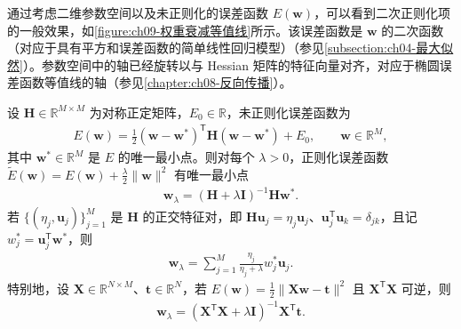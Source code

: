 \documentclass[../../main.tex]{subfiles}
\begin{document}
通过考虑二维参数空间以及未正则化的误差函数 $E(\boldsymbol{w})$，可以看到二次正则化项的一般效果，如\cref{figure:ch09-权重衰减等值线}所示。该误差函数是 $\boldsymbol{w}$ 的二次函数（对应于具有平方和误差函数的简单线性回归模型）（参见\cref{subsection:ch04-最大似然}）。参数空间中的轴已经旋转以与 Hessian 矩阵的特征向量对齐，对应于椭圆误差函数等值线的轴（参见\cref{chapter:ch08-反向传播}）。

\begin{theorem}[$L_{2}$ 正则化的闭式解]\label{theorem:ch09-L2闭式解}
设 $\boldsymbol{H}\in\mathbb{R}^{M\times M}$ 为对称正定矩阵，$E_{0}\in\mathbb{R}$，未正则化误差函数为
\begin{align*}
E(\boldsymbol{w})=\frac{1}{2}(\boldsymbol{w}-\boldsymbol{w}^{*})^{\mathsf T}\boldsymbol{H}(\boldsymbol{w}-\boldsymbol{w}^{*})+E_{0},\qquad \boldsymbol{w}\in\mathbb{R}^{M},
\end{align*}
其中 $\boldsymbol{w}^{*}\in\mathbb{R}^{M}$ 是 $E$ 的唯一最小点。则对每个 $\lambda>0$，正则化误差函数 $\widetilde{E}(\boldsymbol{w})=E(\boldsymbol{w})+\frac{\lambda}{2}\|\boldsymbol{w}\|^{2}$ 有唯一最小点
\begin{align*}
\boldsymbol{w}_{\lambda}=(\boldsymbol{H}+\lambda\boldsymbol{I})^{-1}\boldsymbol{H}\boldsymbol{w}^{*}.
\end{align*}
若 $\{(\eta_{j},\boldsymbol{u}_{j})\}_{j=1}^{M}$ 是 $\boldsymbol{H}$ 的正交特征对，即 $\boldsymbol{H}\boldsymbol{u}_{j}=\eta_{j}\boldsymbol{u}_{j}$、$\boldsymbol{u}_{j}^{\mathsf T}\boldsymbol{u}_{k}=\delta_{jk}$，且记 $w_{j}^{*}=\boldsymbol{u}_{j}^{\mathsf T}\boldsymbol{w}^{*}$，则
\begin{align*}
\boldsymbol{w}_{\lambda}=\sum_{j=1}^{M}\frac{\eta_{j}}{\eta_{j}+\lambda}w_{j}^{*}\boldsymbol{u}_{j}.
\end{align*}
特别地，设 $\boldsymbol{X}\in\mathbb{R}^{N\times M}$、$\boldsymbol{t}\in\mathbb{R}^{N}$，若 $E(\boldsymbol{w})=\frac{1}{2}\|\boldsymbol{X}\boldsymbol{w}-\boldsymbol{t}\|^{2}$ 且 $\boldsymbol{X}^{\mathsf T}\boldsymbol{X}$ 可逆，则
\begin{align*}
\boldsymbol{w}_{\lambda}=(\boldsymbol{X}^{\mathsf T}\boldsymbol{X}+\lambda\boldsymbol{I})^{-1}\boldsymbol{X}^{\mathsf T}\boldsymbol{t}.
\end{align*}
\end{theorem}
\end{document}

